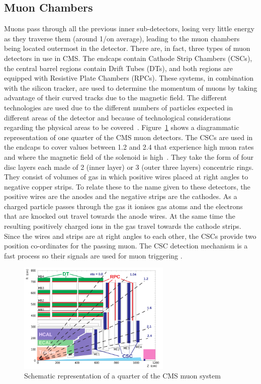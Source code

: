 \subsection{Muon Chambers}
\label{ss:Muon_Chambers}
Muons pass through all the previous inner sub-detectors, losing very little energy as they traverse them
(around 1\MeV/\mm on average), leading to the muon chambers being located outermost in the detector. There
are, in fact, three types of muon detectors in use in CMS. The endcaps contain Cathode Strip Chambers (CSCs),
the central barrel regions contain Drift Tubes (DTs), and both regions are equipped with Resistive Plate
Chambers (RPCs). These systems, in combination with the silicon tracker, are used to determine the momentum of
muons by taking advantage of their curved tracks due to the magnetic field. The different technologies are
used due to the different numbers of particles expected in different areas of the detector and because of
technological considerations regarding the physical areas to be covered~\cite{CMS_TDR1}.
Figure~\ref{fig:CMS_muon_system} shows a diagrammatic representation of one quarter of the CMS muon detectors.
The CSCs are used in the endcaps to cover \abseta values between 1.2 and 2.4 that experience high muon rates
and where the magnetic field of the solenoid is high~\cite{CMS_TDR1}. They take the form of four disc layers
each made of 2 (inner layer) or 3 (outer three layers) concentric rings. They consist of volumes of gas in
which positive wires placed at right angles to negative copper strips. To relate these to the name given to
these detectors, the positive wires are the anodes and the negative strips are the cathodes. As a charged
particle passes through the gas it ionises gas atoms and the electrons that are knocked out travel towards the
anode wires. At the same time the resulting positively charged ions in the gas travel towards the cathode
strips. Since the wires and strips are at right angles to each other, the CSCs provide two position
co-ordinates for the passing muon. The CSC detection mechanism is a fast process so their signals are used for
muon triggering \cite{CMS_experiment}.
 
\begin{figure}[hbtp]
   \centering
     \includegraphics[width=0.65\textwidth]{Chapters/02_Detector/Images/MuonSys-mod3.png}\hfill
     \caption[Schematic representation of a quarter of the CMS muon system.]{Schematic representation of a
     quarter of the CMS muon system \cite{Muon_tracking}}
     \label{fig:CMS_muon_system}
\end{figure}

